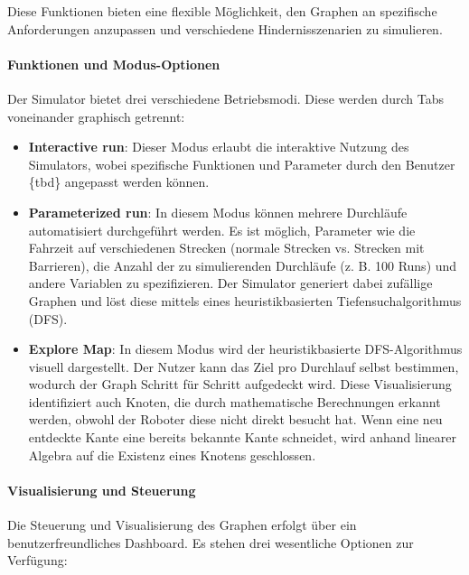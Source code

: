 \documentclass[main.tex]{subfiles} %
\begin{document}
Diese Funktionen bieten eine flexible Möglichkeit, den Graphen an spezifische Anforderungen anzupassen und verschiedene Hindernisszenarien zu simulieren.

\paragraph{Funktionen und Modus-Optionen}

Der Simulator bietet drei verschiedene Betriebsmodi. Diese werden durch Tabs voneinander graphisch getrennt:

\begin{itemize}
    \item \textbf{Interactive run}:
    Dieser Modus erlaubt die interaktive Nutzung des Simulators, wobei spezifische Funktionen und Parameter durch den Benutzer \{tbd\} angepasst werden können.

    \item \textbf{Parameterized run}:  
    In diesem Modus können mehrere Durchläufe automatisiert durchgeführt werden. Es ist möglich, Parameter wie die Fahrzeit auf verschiedenen Strecken (normale Strecken vs. Strecken mit Barrieren), die Anzahl der zu simulierenden Durchläufe (z. B. 100 Runs) und andere Variablen zu spezifizieren. Der Simulator generiert dabei zufällige Graphen und löst diese mittels eines heuristikbasierten Tiefensuchalgorithmus (DFS).

    \item \textbf{Explore Map}:  
    In diesem Modus wird der heuristikbasierte DFS-Algorithmus visuell dargestellt. Der Nutzer kann das Ziel pro Durchlauf selbst bestimmen, wodurch der Graph Schritt für Schritt aufgedeckt wird. Diese Visualisierung identifiziert auch Knoten, die durch mathematische Berechnungen erkannt werden, obwohl der Roboter diese nicht direkt besucht hat. Wenn eine neu entdeckte Kante eine bereits bekannte Kante schneidet, wird anhand linearer Algebra auf die Existenz eines Knotens geschlossen.
\end{itemize}

\paragraph{Visualisierung und Steuerung}

Die Steuerung und Visualisierung des Graphen erfolgt über ein benutzerfreundliches Dashboard. Es stehen drei wesentliche Optionen zur Verfügung:
\end{document}
